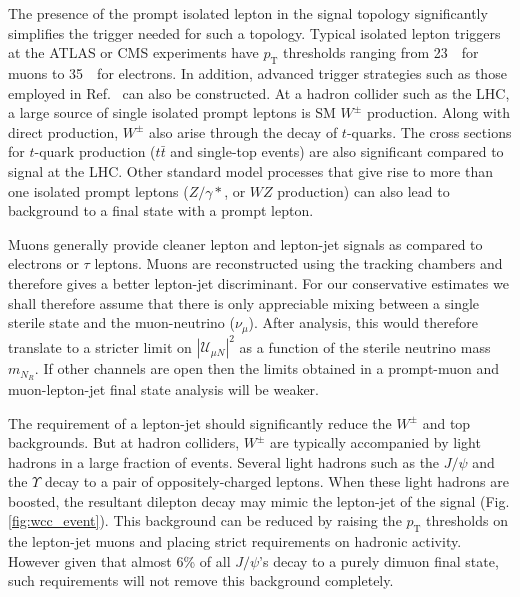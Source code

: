 \documentclass[reprint,doublecolumn,secnumarabic,amssymb, amsmath, aps,nofootinbib,superscriptaddress]{revtex4-1}
\newcommand{\Fig}[1]{Fig.\,\ref{#1}}
\newcommand{\pt}      {\ensuremath{p_{\mathrm{T}}}}
\newcommand{\gev}{~\text{GeV}}
\newcommand{\ttbar}{\ensuremath{t\bar{t}}}
\begin{document}
The presence of the prompt isolated lepton in the signal topology significantly simplifies the trigger needed for such a topology. Typical isolated lepton triggers at the ATLAS or CMS experiments  have $\pt$ thresholds ranging from
23\gev\ for muons to 35\gev\ for electrons. In addition, advanced trigger strategies such as those employed in Ref.~\cite{ATLAS:2016jza} can also be constructed.
At a hadron collider such as the LHC, a large source of single isolated prompt leptons is SM $W^\pm$ production.
Along with direct production, $W^\pm$ also arise through the decay of $t$-quarks. The cross sections for $t$-quark production ($\ttbar$ and single-top events) are also significant compared to signal at the LHC. Other standard model processes that give rise to more than one isolated prompt leptons ($Z/\gamma*$, or $WZ$ production) can also lead to background to a final state with a prompt lepton.

Muons generally provide cleaner lepton and lepton-jet signals as compared to electrons or $\tau$ leptons. Muons
are reconstructed using the tracking chambers and therefore gives a better lepton-jet discriminant. For our conservative estimates we shall therefore assume that there is only appreciable mixing between a single sterile state and the muon-neutrino ($\nu_\mu$). After analysis, this would therefore translate to a stricter limit on $|\mathcal{U}_{\mu N}|^2$ as a function of the sterile neutrino mass $m_{N_R}$. If other channels are open then the limits obtained in a prompt-muon and muon-lepton-jet final state analysis will be weaker.

The requirement of a lepton-jet should significantly reduce the $W^\pm$ and top backgrounds. But at hadron colliders, $W^\pm$ are typically accompanied by light hadrons in a large fraction of events. Several light hadrons such as the $J/\psi$ and the $\Upsilon$ decay to a pair of oppositely-charged leptons. When these light hadrons are boosted, the resultant dilepton decay may mimic the lepton-jet of the signal (\Fig{fig:wcc_event}). This
background can be reduced by raising the $\pt$ thresholds on the lepton-jet muons and placing strict requirements on hadronic activity. However given that almost 6\% of all $J/\psi$'s decay to a purely dimuon final state, such
requirements will not remove this background completely.
\end{document}
